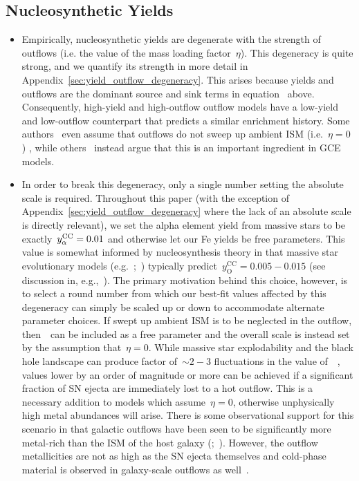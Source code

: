 \documentclass[ms.tex]{subfiles}
\begin{document}
\subsection{Nucleosynthetic Yields}
\label{sec:onezone:yields}

\begin{itemize}

	\item Empirically, nucleosynthetic yields are degenerate with the strength
	of outflows (i.e. the value of the mass loading factor~$\eta$).
	This degeneracy is quite strong, and we quantify its strength in more
	detail in Appendix~\ref{sec:yield_outflow_degeneracy}.
	This arises because yields and outflows are the dominant source and sink
	terms in equation~ above.
	Consequently, high-yield and high-outflow outflow models have a low-yield
	and low-outflow counterpart that predicts a similar enrichment history.
	Some authors~\citep[e.g.][]{Minchev2013, Minchev2014, Minchev2017,
	Spitoni2020, Spitoni2021} even assume that outflows do not sweep up ambient
	ISM (i.e.~$\eta = 0$) , while others~\citep[e.g.][]{Andrews2017,
	Weinberg2017, Cote2017, Trueman2022} instead argue that this is an
	important ingredient in GCE models.

	\item In order to break this degeneracy, only a single number setting the
	absolute scale is required.
	Throughout this paper (with the exception of
	Appendix~\ref{sec:yield_outflow_degeneracy} where the lack of an absolute
	scale is directly relevant), we set the alpha element yield from massive
	stars to be exactly~$y_\alpha^\text{CC} = 0.01$ and otherwise let our Fe yields be
	free parameters.
	This value is somewhat informed by nucleosynthesis theory in that massive
	star evolutionary models (e.g.~\citealp*{Nomoto2013};~\citealp{Sukhbold2016,
	Limongi2018}) typically predict~$y_\text{O}^\text{CC} = 0.005 - 0.015$
	(see discussion in, e.g.,~\citealp{Weinberg2017, Johnson2020}).
	The primary motivation behind this choice, however, is to select a round
	number from which our best-fit values affected by this degeneracy can
	simply be scaled up or down to accommodate alternate parameter choices.
	If swept up ambient ISM is to be neglected in the outflow, then~\yacc~can
	be included as a free parameter and the overall scale is instead set by
	the assumption that~$\eta = 0$.
	While massive star explodability and the black hole landscape
	\citep[e.g.][]{Pejcha2015, Ertl2016, Sukhbold2016} can produce factor
	of~$\sim2 - 3$ fluctuations in the value of~\yacc~\citep{Griffith2021},
	values lower by an order of magnitude or more can be achieved if a
	significant fraction of SN ejecta are immediately lost to a hot outflow.
	This is a necessary addition to models which assume~$\eta = 0$, otherwise
	unphysically high metal abundances will arise. 
	There is some observational support for this scenario in that galactic
	outflows have been seen to be significantly more metal-rich than the ISM of
	the host galaxy (\citealp*{Chisholm2018};~\citealp{Cameron2021}).
	However, the outflow metallicities are not as high as the SN ejecta
	themselves and cold-phase material is observed in galaxy-scale outflows as
	well~\citep[e.g.][]{Lopez2020, Veilleux2020}.


\end{itemize}
\end{document}
